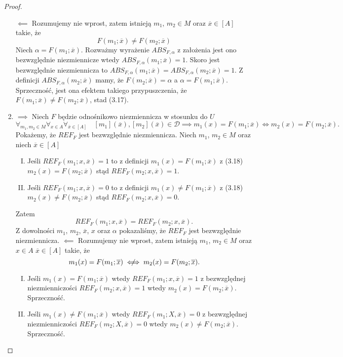 \documentclass[12pt,a4paper]{report}
\newcommand{\domkniecie}[1]{\left\lbrack{#1}\right\rbrack}
\newcommand{\notiff}{%
  \mathrel{{\ooalign{\hidewidth$\not\phantom{"}$\hidewidth\cr$\iff$}}}}
\begin{document}
\begin{proof}
\begin{enumerate}
$\impliedby$
Rozumujemy nie wprost, zatem istnieją $m_1$, $m_2 \in M$ oraz $\overline{x} \in \domkniecie{A}$ takie, że
$$
F(m_1;\overline{x})\ne F(m_2;\overline{x})
$$
Niech $\alpha=F(m_1;\overline{x})$. Rozważmy wyrażenie $ABS_{F,\alpha}$  z założenia jest ono bezwzględnie niezmiennicze wtedy $ABS_{F,\alpha}(m_1;\overline{x})=1$. Skoro jest bezwzględnie niezmiennicza  to $ABS_{F,\alpha}(m_1;\overline{x})=ABS_{F,\alpha}(m_2;\overline{x})=1$. Z definicji $ABS_{F,\alpha}(m_2;\overline{x})$ mamy, że $F(m_2;\overline{x})=\alpha$ a $\alpha=F(m_1;\overline{x})$. Sprzeczność, jest ona efektem takiego przypuszczenia, że $F(m_1;\overline{x})\ne F(m_2;\overline{x})$, stad (3.17).
\item
$\implies$
Niech $F$ będzie odnośnikowo niezmiennicza w stosunku do $U$ 
\begin{equation}
\forall_{m_{1}, m_{2} \in M} \forall_{x \in A} \forall_{\overline{x} \in \domkniecie{A}} \quad \domkniecie{m_1}(\overline{x}), \domkniecie{m_2}(\overline{x})\in \mathcal{D} \implies  m_{1}(x)=F(m_{1};\overline{x}) \iff m_{2}(x)=F(m_{2};\overline{x}).
\end{equation}
Pokażemy, że $REF_{F}$ jest bezwzględnie niezmiennicza. Niech $m_1$, $m_2 \in M$ oraz niech $\overline{x} \in \domkniecie{A}$ 
\begin{enumerate}[I.]
\item
Jeśli $REF_{F}(m_1;x,\overline{x})=1$ to z definicji $m_1(x)=F(m_1;\overline{x})$ z (3.18) $m_2(x)=F(m_2;\overline{x})$ stąd $REF_{F}(m_2;x,\overline{x})=1$.
\item
Jeśli $REF_{F}(m_1;x,\overline{x})=0$ to z definicji $m_1(x)\ne F(m_1;\overline{x})$ z (3.18) $m_2(x)\ne F(m_2;\overline{x})$ stąd $REF_{F}(m_2;x,\overline{x})=0$.
\end{enumerate}
Zatem 
$$
REF_{F}(m_1;x,\overline{x})=REF_{F}(m_2;x,\overline{x}).
$$
Z dowolności $m_1$, $m_2$, $\overline{x}$, $x$ oraz $\alpha$ pokazaliśmy, że $REF_{F}$ jest bezwzględnie niezmiennicza.
$\impliedby$
Rozumujemy nie wprost, zatem istnieją $m_1$, $m_2 \in M$ oraz$x\in A$ $\overline{x} \in \domkniecie{A}$ takie, że
$$
m_{1}(x)=F(m_{1};\overline{x}) \notiff m_{2}(x)=F(m_{2};\overline{x}).
$$
\begin{enumerate}[I.]
\item
Jeśli $m_1(x)=F(m_1;\overline{x})$ wtedy $REF_{F}(m_1;x,\overline{x})=1$ z bezwzględnej niezmienniczości $REF_{F}(m_2;x,\overline{x})=1$ wtedy $m_2(x)=F(m_2;\overline{x})$. Sprzeczność.
\item
Jeśli $m_1(x)\ne F(m_1;\overline{x})$ wtedy $REF_{F}(m_1;X,\overline{x})=0$ z bezwzględnej niezmienniczości $REF_{F}(m_2;X,\overline{x})=0$ wtedy $m_2(x)\ne F(m_2;\overline{x})$. Sprzeczność.

\end{enumerate}
\end{enumerate}
\end{proof}
\end{document}

